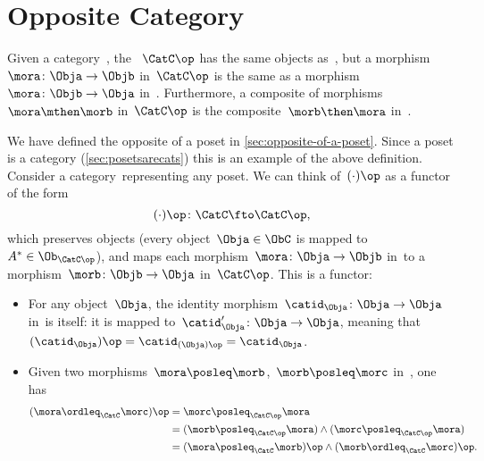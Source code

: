\section{Opposite Category}

\begin{ctdefinition}
  \label{def:oppositecat}
  Given a category~\CatC, the \emph{}~$\CatC\op$ has the same objects as~\CatC, but a morphism~$\mora\colon \Obja\to \Objb$ in~$\CatC\op$ is the same as a morphism~$\mora\colon \Objb\to \Obja$ in~\CatC. Furthermore, a composite of morphisms~$\mora \mthen \morb$ in~$\CatC\op$ is the composite~$\morb\then \mora$ in~\CatC.
\end{ctdefinition}

\begin{example}
  We have defined the opposite of a poset in \cref{sec:opposite-of-a-poset}.
  Since a poset is a category (\cref{sec:posetsarecats})
  this is an example of the above definition. Consider a category~\CatC representing any poset. We can think of~$(\cdot)\op$ as a functor of the form
  \begin{equation}
  (\cdot)
    \op\colon \CatC \fto \CatC\op,
  \end{equation}
  which preserves objects (every object~$\Obja \in \ObC$ is mapped to~$A^*\in \Ob_{\CatC\op}$), and maps each morphism~$\mora\colon \Obja\to \Objb$ in~\CatC to a morphism~$\morb\colon \Objb\to \Obja$ in~$\CatC\op$. This is a functor:
  \begin{itemize}
    \item For any object~$\Obja$, the identity morphism~$\catid_\Obja\colon \Obja\to \Obja$ in~\CatC is itself: it is mapped to~$\catid_\Obja'\colon \Obja\to \Obja$, meaning that~$(\catid_\Obja)\op=\catid_{(\Obja)\op}=\catid_\Obja$.
    \item Given two morphisms~$\mora \posleq \morb$,~$\morb\posleq \morc$ in~\CatC, one has
    \begin{equation}
      \begin{aligned}
      (\mora \ordleq_{\CatC} \morc)
        \op &=\morc\posleq_{\CatC\op} \mora\\
        &=(\morb \posleq_{\CatC\op} \mora)\wedge (\morc\posleq_{\CatC\op}\mora)\\
        &=(\mora\posleq_{\CatC} \morb)\op \wedge (\morb\ordleq_{\CatC} \morc)\op.
      \end{aligned}
    \end{equation}
  \end{itemize}
\end{example}
